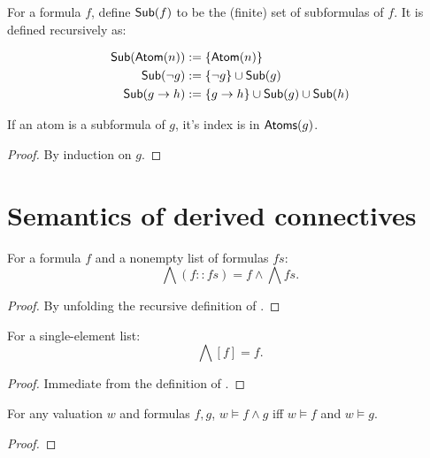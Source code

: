 \begin{definition}
    \label{Sub}
    \leanok
    For a formula $f$, define $\mathsf{Sub}(f)$ to be the (finite) set of subformulas of $f$.
    It is defined recursively as:

    \[
    \begin{align}
        \mathsf{Sub}(\mathsf{Atom}(n)) &:= \{\mathsf{Atom}(n)\} \\
        \mathsf{Sub}(\neg g) &:= \{\neg g\} \cup \mathsf{Sub}(g) \\
        \mathsf{Sub}(g \to h) &:= \{g \to h\} \cup \mathsf{Sub}(g) \cup \mathsf{Sub}(h) \\
    \end{align}
    \]
\end{definition}

\begin{lemma}
    \label{mem_atoms_of_subformula}
    \leanok
    If an atom is a subformula of $g$, it's index is in $\mathsf{Atoms}(g)$.
\end{lemma}
\begin{proof}
    \leanok
    By induction on $g$.
\end{proof}

\section{Semantics of derived connectives}

\begin{lemma}
    \label{BigAnd.cons}
    \leanok
    For a formula $f$ and a nonempty list of formulas $fs$:
    \[
    \bigwedge (f :: fs) = f \wedge \bigwedge fs.
    \]
\end{lemma}
\begin{proof}
    \leanok
    By unfolding the recursive definition of \BigAnd.
\end{proof}

\begin{lemma}
    \label{BigAnd.single}
    \leanok
    For a single-element list:
    \[
    \bigwedge [f] = f.
    \]
\end{lemma}
\begin{proof}
    \leanok
    Immediate from the definition of \BigAnd.
\end{proof}

\begin{lemma}
    \label{Satisfies.and}
    \leanok
    For any valuation $w$ and formulas $f,g$, $w \models f \wedge g$ iff $w \models f$ and $w \models g$.
\end{lemma}
\begin{proof}
    \leanok
\end{proof}

